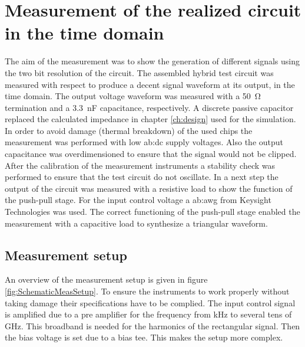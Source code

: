 \chapter{Measurement of the realized circuit in the time domain}

The aim of the measurement was to show the generation of different signals using the two bit resolution of the circuit.
The assembled hybrid test circuit was measured with respect to produce a decent signal waveform at its output, in the time domain.
The output voltage waveform was measured with a \SI{50}{\ohm} termination and a \SI{3.3}{\nano\farad} capacitance, respectively.
A discrete passive capacitor replaced the calculated impedance in chapter \ref{ch:design} used for the simulation.
In order to avoid damage (thermal breakdown) of the used chips the measurement was performed with low \gls{ab:dc} supply voltages.
Also the output capacitance was overdimensioned to ensure that the signal would not be clipped.
\\
After the calibration of the measurement instruments a stability check was performed to ensure that the test circuit do not oscillate.
In a next step the output of the circuit was measured with a resistive load to show the function of the push-pull stage.
For the input control voltage a \gls{ab:awg} from Keysight Technologies was used.
The correct functioning of the push-pull stage enabled the measurement with a capacitive load to synthesize a triangular waveform.


\section{Measurement setup}
An overview of the measurement setup is given in figure \ref{fig:SchematicMeasSetup}.
To ensure the instruments to work properly without taking damage their specifications have to be complied.
The input control signal is amplified due to a pre amplifier for the frequency from kHz to several tens of GHz.
This broadband is needed for the harmonics of the rectangular signal.
Then the bias voltage is set due to a bias tee.
This makes the setup more complex.



